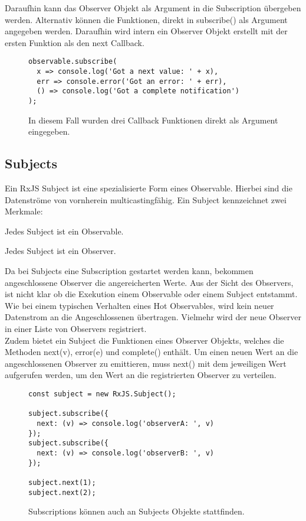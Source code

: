 \noindent
Daraufhin kann das Observer Objekt als Argument in die Subscription übergeben werden. Alternativ können die Funktionen, direkt in subscribe() als Argument angegeben werden. Daraufhin wird intern ein Observer Objekt erstellt mit der ersten Funktion als den next Callback.

\begin{figure}[H]
\begin{lstlisting}[basicstyle=\small]
observable.subscribe(
  x => console.log('Got a next value: ' + x),
  err => console.error('Got an error: ' + err),
  () => console.log('Got a complete notification')
);
\end{lstlisting}
\caption{In diesem Fall wurden drei Callback Funktionen direkt als Argument eingegeben.}
\end{figure}

\subsection{Subjects}

Ein RxJS Subject ist eine spezialisierte Form eines Observable. Hierbei sind die Datenströme von vornherein multicastingfähig. Ein Subject kennzeichnet zwei Merkmale:

\begin{description}
\item Jedes Subject ist ein Observable.
\item Jedes Subject ist ein Observer.
\end{description}

\noindent
Da bei Subjects eine Subscription gestartet werden kann, bekommen angeschlossene Observer die angereicherten Werte. Aus der Sicht des Observers, ist nicht klar ob die Exekution einem Observable oder einem Subject entstammt. Wie bei einem typischen Verhalten eines Hot Observables, wird kein neuer Datenstrom an die Angeschlossenen übertragen. Vielmehr wird der neue Observer in einer Liste von Observers registriert.\\

\noindent
Zudem bietet ein Subject die Funktionen eines Observer Objekts, welches die Methoden next(v), error(e) und complete() enthält. Um einen neuen Wert an die angeschlossenen Observer zu emittieren, muss next() mit dem jeweiligen Wert aufgerufen werden, um den Wert an die registrierten Observer zu verteilen.

\begin{figure}[H]
\begin{lstlisting}[basicstyle=\small]
const subject = new RxJS.Subject();

subject.subscribe({
  next: (v) => console.log('observerA: ', v)
});
subject.subscribe({
  next: (v) => console.log('observerB: ', v)
});

subject.next(1);
subject.next(2);
\end{lstlisting}
\caption{Subscriptions können auch an Subjects Objekte stattfinden.}
\end{figure}

